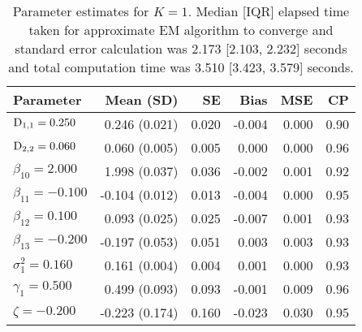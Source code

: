 \begin{table}[ht]
\centering
{}
\captionsetup{font=scriptsize}
\begingroup\scriptsize
\begin{tabular}{l|rrrrr}
  Parameter & Mean (SD) & SE & Bias & MSE & CP \\ 
  \hline
  $\mathrm{D}_{1,1} = 0.250$ &  0.246 (0.021) & 0.020 & -0.004 & 0.000 & 0.90 \\ 
  $\mathrm{D}_{2,2} = 0.060$ &  0.060 (0.005) & 0.005 &  0.000 & 0.000 & 0.96 \\ 
  $\beta_{10} = 2.000$ &  1.998 (0.037) & 0.036 & -0.002 & 0.001 & 0.92 \\ 
  $\beta_{11} = -0.100$ & -0.104 (0.012) & 0.013 & -0.004 & 0.000 & 0.95 \\ 
  $\beta_{12} = 0.100$ &  0.093 (0.025) & 0.025 & -0.007 & 0.001 & 0.93 \\ 
  $\beta_{13} = -0.200$ & -0.197 (0.053) & 0.051 &  0.003 & 0.003 & 0.93 \\ 
  $\sigma^2_1 = 0.160$ &  0.161 (0.004) & 0.004 &  0.001 & 0.000 & 0.93 \\ 
  $\gamma_1 = 0.500$ &  0.499 (0.093) & 0.093 & -0.001 & 0.009 & 0.96 \\ 
  $\zeta = -0.200$ & -0.223 (0.174) & 0.160 & -0.023 & 0.030 & 0.95 \\ 
   \hline
\end{tabular}
\endgroup
\caption{Parameter estimates for $K=1$. Median [IQR] elapsed time taken for approximate EM algorithm to converge and standard error calculation was 2.173 [2.103, 2.232] seconds and total computation time was 3.510 [3.423, 3.579] seconds.} 
\end{table}

